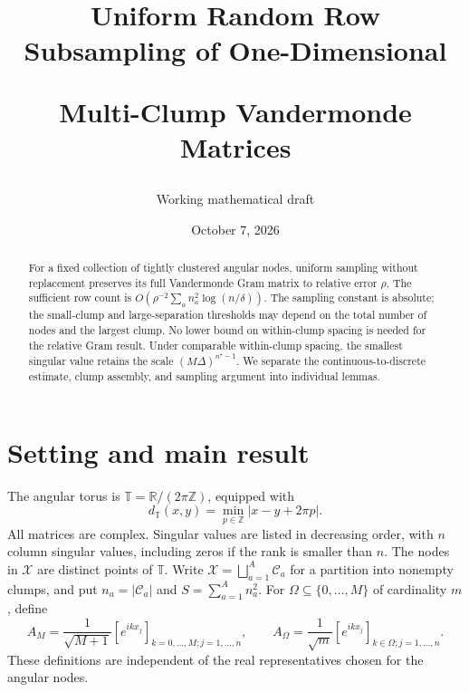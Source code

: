 \documentclass[11pt]{article}
\title{Uniform Random Row Subsampling of One-Dimensional\par Multi-Clump Vandermonde Matrices}
\author{Working mathematical draft}
\date{October 7, 2026}
\theoremstyle{remark}\newtheorem{remark}[theorem]{Remark}
\newcommand{\T}{\mathbb T}
\newcommand{\R}{\mathbb R}
\newcommand{\abs}[1]{\left|#1\right|}
\begin{document}
\maketitle
\begin{abstract}
For a fixed collection of tightly clustered angular nodes, uniform sampling
without replacement preserves its full Vandermonde Gram matrix to relative
error $\rho$. The sufficient row count is
$O(\rho^{-2}\sum_a n_a^2\log(n/\delta))$.
The sampling constant is absolute; the small-clump and large-separation
thresholds may depend on the total number of nodes and the largest clump.
No lower bound on within-clump spacing is needed for the relative Gram result.
Under comparable within-clump spacing, the smallest singular value retains
the scale $(M\Delta)^{n^\star-1}$. We separate the continuous-to-discrete
estimate, clump assembly, and sampling argument into individual lemmas.
\end{abstract}

\section{Setting and main result}
The angular torus is $\T=\R/(2\pi\mathbb Z)$, equipped with
\[
 d_{\T}(x,y)=\min_{p\in\mathbb Z}\abs{x-y+2\pi p}.
\]
All matrices are complex. Singular values are listed in decreasing order,
with $n$ column singular values, including zeros if the rank is smaller than
$n$. The nodes in $\mathcal X$ are distinct points of $\T$.
Write $\mathcal X=\bigsqcup_{a=1}^{A}\mathcal C_a$ for a partition into
nonempty clumps, and put $n_a=\abs{\mathcal C_a}$ and
$S=\sum_{a=1}^{A}n_a^2$. For $\Omega\subseteq\{0,\ldots,M\}$ of cardinality
$m$, define
\[
 A_M=\frac1{\sqrt{M+1}}[e^{ikx_j}]_{k=0,\ldots,M; j=1,\ldots,n},
 \qquad
 A_\Omega=\frac1{\sqrt m}[e^{ikx_j}]_{k\in\Omega; j=1,\ldots,n}.
\]
These definitions are independent of the real representatives chosen for
the angular nodes.
\end{document}
